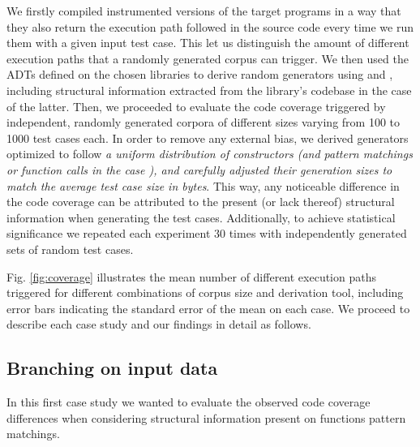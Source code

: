 We firstly compiled instrumented versions of the target programs in a way that
they also return the execution path followed in the source code every time we
run them with a given input test case.
%
This let us distinguish the amount of different execution paths that a randomly
generated corpus can trigger.
%
We then used the ADTs defined on the chosen libraries to derive random
generators using \dragen and \dragenp, including structural information
extracted from the library's codebase in the case of the latter.
%
Then, we proceeded to evaluate the code coverage triggered by independent,
randomly generated corpora of different sizes varying from 100 to 1000 test
cases each.
%
In order to remove any external bias, we derived generators optimized to follow
\emph{a uniform distribution of constructors (and pattern matchings or function
  calls in the case \dragenp), and carefully adjusted their generation sizes to
  match the average test case size in bytes}.
%
This way, any noticeable difference in the code coverage can be attributed to
the present (or lack thereof) structural information when generating the test
cases.
%
Additionally, to achieve statistical significance we repeated each experiment 30
times with independently generated sets of random test cases.

\begin{figure*}[t]
  \vspace{-5pt}%
  \centering
  
  \hspace{5pt}%
  
  \caption{Path coverage comparison between \dragen (\ref{exp:dragen}) and
    \dragenp (\ref{exp:dragenp}). }
  \label{fig:coverage}
  \vspace{-10pt}%
\end{figure*}
%
Fig. \ref{fig:coverage} illustrates the mean number of different execution paths
triggered for different combinations of corpus size and derivation tool,
including error bars indicating the standard error of the mean on each case.
%
We proceed to describe each case study and our findings in detail as follows.

\subsection{Branching on input data}

In this first case study we wanted to evaluate the observed code coverage
differences when considering structural information present on functions pattern
matchings.


